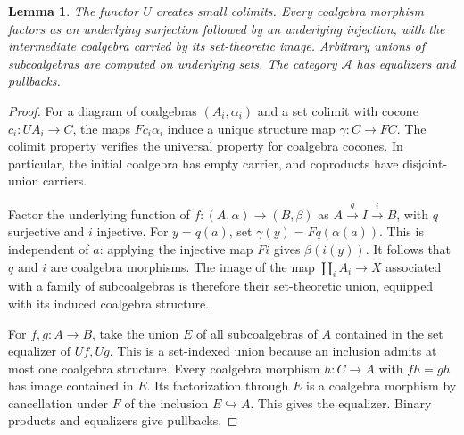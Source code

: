 \documentclass[11pt]{article}
\newtheorem{lemma}[theorem]{Lemma}
\begin{document}
\begin{lemma}\label{lem:coalgebra-images-limits}
The functor $U$ creates small colimits. Every coalgebra morphism factors as an underlying surjection followed by an underlying injection, with the intermediate coalgebra carried by its set-theoretic image. Arbitrary unions of subcoalgebras are computed on underlying sets. The category $\mathcal A$ has equalizers and pullbacks.
\end{lemma}
\begin{proof}
For a diagram of coalgebras $(A_i,\alpha_i)$ and a set colimit with cocone $c_i:UA_i\to C$, the maps $Fc_i\alpha_i$ induce a unique structure map $\gamma:C\to FC$. The colimit property verifies the universal property for coalgebra cocones. In particular, the initial coalgebra has empty carrier, and coproducts have disjoint-union carriers.

Factor the underlying function of $f:(A,\alpha)\to(B,\beta)$ as $A\xrightarrow{q}I\xrightarrow{i}B$, with $q$ surjective and $i$ injective. For $y=q(a)$, set $\gamma(y)=Fq(\alpha(a))$. This is independent of $a$: applying the injective map $Fi$ gives $\beta(i(y))$. It follows that $q$ and $i$ are coalgebra morphisms. The image of the map $\coprod_i A_i\to X$ associated with a family of subcoalgebras is therefore their set-theoretic union, equipped with its induced coalgebra structure.

For $f,g:A\to B$, take the union $E$ of all subcoalgebras of $A$ contained in the set equalizer of $Uf,Ug$. This is a set-indexed union because an inclusion admits at most one coalgebra structure. Every coalgebra morphism $h:C\to A$ with $fh=gh$ has image contained in $E$. Its factorization through $E$ is a coalgebra morphism by cancellation under $F$ of the inclusion $E\hookrightarrow A$. This gives the equalizer. Binary products and equalizers give pullbacks.
\end{proof}
\end{document}
